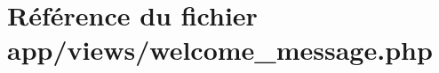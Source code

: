 \hypertarget{welcome__message_8php}{}\section{Référence du fichier app/views/welcome\+\_\+message.php}
\label{welcome__message_8php}
